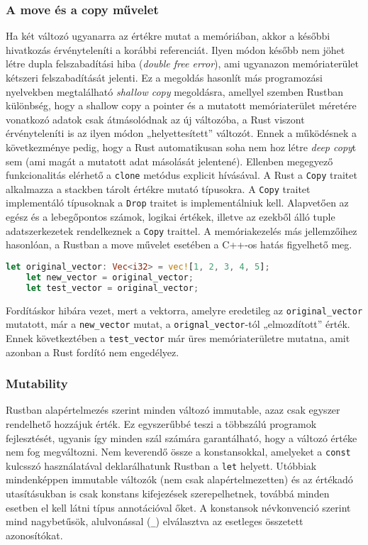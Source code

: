 \subsubsection{A move és a copy művelet}
Ha két változó ugyanarra az értékre mutat a memóriában, akkor a későbbi hivatkozás érvényteleníti a korábbi referenciát. Ilyen módon később nem jöhet létre dupla felszabadítási hiba (\textit{double free error}), ami ugyanazon memóriaterület kétszeri felszabadítását jelenti. Ez a megoldás hasonlít más programozási nyelvekben megtalálható \textit{shallow copy} megoldásra, amellyel szemben Rustban különbség, hogy a shallow copy a pointer és a mutatott memóriaterület méretére vonatkozó adatok csak átmásolódnak az új változóba, a Rust viszont érvényteleníti is az ilyen módon „helyettesített” változót. Ennek a működésnek a következménye pedig, hogy a Rust automatikusan soha nem hoz létre \textit{deep copy}t sem (ami magát a mutatott adat másolását jelentené). Ellenben megegyező funkcionalitás elérhető a \lstinline{clone} metódus explicit hívásával. A Rust a \lstinline{Copy} traitet alkalmazza a stackben tárolt értékre mutató típusokra. A \lstinline{Copy} traitet implementáló típusoknak a \lstinline{Drop} traitet is implementálniuk kell. Alapvetően az egész és a lebegőpontos számok, logikai értékek, illetve az ezekből álló tuple adatszerkezetek rendelkeznek a \lstinline{Copy} traittel. A memóriakezelés más jellemzőihez hasonlóan, a Rustban a move művelet esetében a C++-os hatás figyelhető meg.
\begin{lstlisting}[language=Rust, style=boxed]
    let original_vector: Vec<i32> = vec![1, 2, 3, 4, 5];
    let new_vector = original_vector;
    let test_vector = original_vector;
\end{lstlisting}
Fordításkor hibára vezet, mert a vektorra, amelyre eredetileg az \lstinline{original_vector} mutatott,  már a \lstinline{new_vector} mutat, a \lstinline{orignal_vector}-tól „elmozdított” érték. Ennek következtében a \lstinline{test_vector} már üres memóriaterületre mutatna, amit azonban a Rust fordító nem engedélyez.

\subsubsection{Mutability}
Rustban alapértelmezés szerint minden változó immutable, azaz csak egyszer rendelhető hozzájuk érték. Ez egyszerűbbé teszi a többszálú programok fejlesztését, ugyanis így minden szál számára garantálható, hogy a változó értéke nem fog megváltozni. Nem keverendő össze a konstansokkal, amelyeket a \texttt{const} kulcsszó használatával deklarálhatunk Rustban a \texttt{let} helyett. Utóbbiak mindenképpen immutable változók (nem csak alapértelmezetten) és az értékadó utasításukban is csak konstans kifejezések szerepelhetnek, továbbá minden esetben el kell látni típus annotációval őket. A konstansok névkonvenció szerint mind nagybetűsök, alulvonással (\lstinline{_}) elválasztva az esetleges összetett azonosítókat.

